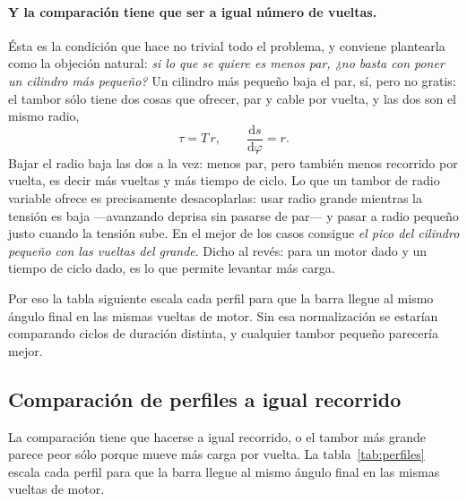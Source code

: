 \paragraph{Y la comparación tiene que ser a igual número de vueltas.} Ésta es la condición que hace
no trivial todo el problema, y conviene plantearla como la objeción natural: \emph{si lo que se
quiere es menos par, ¿no basta con poner un cilindro más pequeño?} Un cilindro más pequeño baja el
par, sí, pero no gratis: el tambor sólo tiene dos cosas que ofrecer, par y cable por vuelta, y las
dos son el mismo radio,
\begin{equation}
  \tau = T\,r, \qquad \frac{\mathrm{d}s}{\mathrm{d}\varphi} = r .
\end{equation}
Bajar el radio baja las dos a la vez: menos par, pero también menos recorrido por vuelta, es decir
más vueltas y más tiempo de ciclo. Lo que un tambor de radio variable ofrece es precisamente
desacoplarlas: usar radio grande mientras la tensión es baja ---avanzando deprisa sin pasarse de
par--- y pasar a radio pequeño justo cuando la tensión sube. En el mejor de los casos consigue
\emph{el pico del cilindro pequeño con las vueltas del grande}. Dicho al revés: para un motor dado y
un tiempo de ciclo dado, es lo que permite levantar más carga.

Por eso la tabla siguiente escala cada perfil para que la barra llegue al mismo ángulo final en las
mismas vueltas de motor. Sin esa normalización se estarían comparando ciclos de duración distinta, y
cualquier tambor pequeño parecería mejor.

\subsection{Comparación de perfiles a igual recorrido}

La comparación tiene que hacerse a igual recorrido, o el tambor más grande parece peor sólo porque
mueve más carga por vuelta. La tabla~\ref{tab:perfiles} escala cada perfil para que la barra llegue
al mismo ángulo final en las mismas vueltas de motor.

